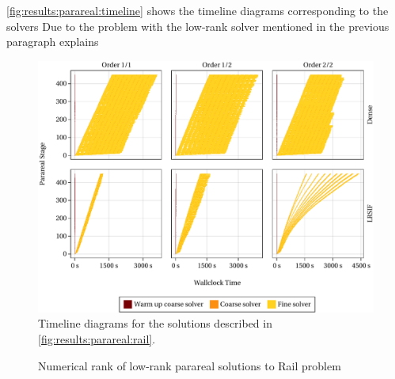 \autoref{fig:results:parareal:timeline} shows the timeline diagrams corresponding to the solvers
Due to the problem with the low-rank  solver mentioned in the previous paragraph explains

\begin{figure}[tp]
  \includegraphics[width=\textwidth]{figures/fig_timeline_all.pdf}
  \caption[Timeline diagrams for parareal method applied to Rail problem]{%
    Timeline diagrams for the solutions described in \autoref{fig:results:parareal:rail}.
  }
  \label{fig:results:parareal:timeline}
\end{figure}

\begin{figure}[t]
  \caption{Numerical rank of low-rank parareal solutions to Rail problem}
\end{figure}


